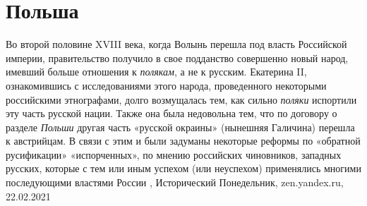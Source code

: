  
 
 
 
 
\chapter{Польша}

Во второй половине XVIII века, когда Волынь перешла под власть Российской
империи, правительство получило в свое подданство совершенно новый народ,
имевший больше отношения к \emph{полякам}, а не к русским. Екатерина II, ознакомившись
с исследованиями этого народа, проведенного некоторыми российскими этнографами,
долго возмущалась тем, как сильно \emph{поляки} испортили эту часть русской нации.
Также она была недовольна тем, что по договору о разделе \emph{Польши} другая часть
«русской окраины» (нынешняя Галичина) перешла к австрийцам. В связи с этим и
были задуманы некоторые реформы по «обратной русификации» «испорченных», по
мнению российских чиновников, западных русских, которые с тем или иным успехом
(или неуспехом) применялись многими последующими властями России
, 
Исторический Понедельник, zen.yandex.ru, 22.02.2021 

